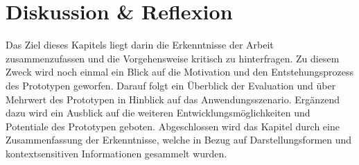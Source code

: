 \documentclass[Bachelorarbeit.tex]{subfiles}
\begin{document}
\chapter{Diskussion \& Reflexion}
\label{chap:reflexion}

\label{chap:reflexion:sec:zusammenfassung}

\begin{comment}
\ideas{Interviews: mehr Personen anderer Modus?}
\ideas{Evaluation Gruppeneinteilung, Modus}
\ideas{Leaflet.js}
\end{comment}


Das Ziel dieses Kapitels liegt darin die Erkenntnisse der Arbeit zusammenzufassen und die Vorgehensweise kritisch zu hinterfragen.
Zu diesem Zweck wird noch einmal ein Blick auf die Motivation und den Entstehungsprozess des Prototypen geworfen.
Darauf folgt ein Überblick der Evaluation und über Mehrwert des Prototypen in Hinblick auf das Anwendungsszenario.
Ergänzend dazu wird ein Ausblick auf die weiteren Entwicklungsmöglichkeiten und Potentiale des Prototypen geboten. 
Abgeschlossen wird das Kapitel durch eine Zusammenfassung der Erkenntnisse, welche in Bezug auf Darstellungsformen und kontextsensitiven Informationen gesammelt wurden.
\end{document}
